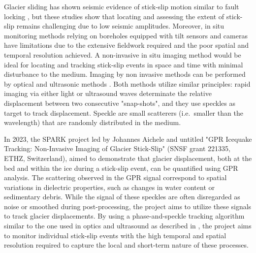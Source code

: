 Glacier sliding has shown seismic evidence of stick-slip motion similar to fault locking \citep{Podolskiy&al2016,Graff&Walter2021}, but these studies show that locating and assessing the extent of stick-slip remains challenging due to low seismic amplitudes. Moreover, in situ monitoring methods relying on boreholes equipped with tilt sensors and cameras have limitations due to the extensive fieldwork required and the poor spatial and temporal resolution achieved. A non-invasive in situ imaging method would be ideal for locating and tracking stick-slip events in space and time with minimal disturbance to the medium. Imaging by non invasive methods can be performed by optical \citep[e.g.][]{Rubino&al2020,Steinhardt&al2022} and ultrasonic methods \citep[e.g.][]{Latour&al2011,Aichele&al2023}. Both methods utilize similar principles: rapid imaging via either light or ultrasound waves determinate the relative displacement between two consecutive "snap-shots", and they use speckles as target to track displacement. Speckle are small scatterers (i.e.\ smaller than the wavelength) that are randomly distributed in the medium. 

In 2023, the SPARK project led by Johannes Aichele and untitled "GPR Icequake Tracking: Non-Invasive Imaging of Glacier Stick-Slip" (SNSF grant 221335, ETHZ, Switzerland), aimed to demonstrate that glacier displacement, both at the bed and within the ice during a stick-slip event, can be quantified using GPR analysis. The scattering observed in the GPR signal correspond to spatial variations in dielectric properties, such as changes in water content or sedimentary debris. While the signal of these speckles are often disregarded as noise or smoothed during post-processing, the project aims to utilize these signals to track glacier displacements. By using a phase-and-speckle tracking algorithm similar to the one used in optics and ultrasound as described in \cite{Aichele2019}, the project aims to monitor individual stick-slip events with the high temporal and spatial resolution required to capture the local and short-term nature of these processes.

